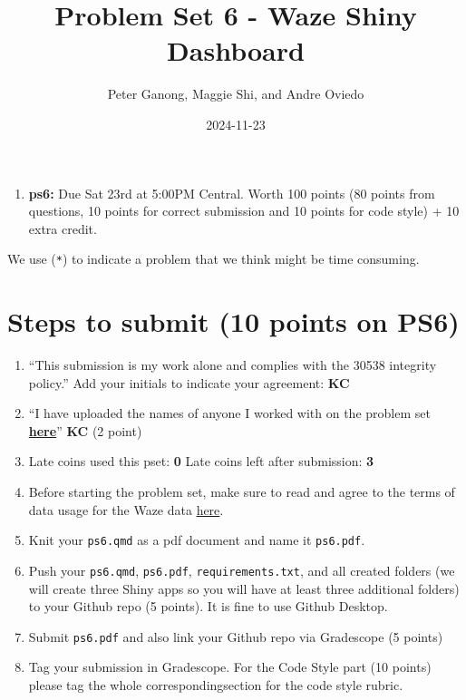 \documentclass[
  letterpaper,
  DIV=11,
  numbers=noendperiod]{scrartcl}
\title{Problem Set 6 - Waze Shiny Dashboard}
\author{Peter Ganong, Maggie Shi, and Andre Oviedo}
\date{2024-11-23}
\providecommand{\tightlist}{%
  \setlength{\itemsep}{0pt}\setlength{\parskip}{0pt}}\usepackage{longtable,booktabs,array}
\begin{document}
\maketitle



\begin{enumerate}
\def\labelenumi{\arabic{enumi}.}
\tightlist
\item
  \textbf{ps6:} Due Sat 23rd at 5:00PM Central. Worth 100 points (80
  points from questions, 10 points for correct submission and 10 points
  for code style) + 10 extra credit.
\end{enumerate}

We use (\texttt{*}) to indicate a problem that we think might be time
consuming.

\section*{Steps to submit (10 points on
PS6)}\label{steps-to-submit-10-points-on-ps6}

\begin{enumerate}
\def\labelenumi{\arabic{enumi}.}
\item
  ``This submission is my work alone and complies with the 30538
  integrity policy.'' Add your initials to indicate your agreement:
  \textbf{KC}
\item
  ``I have uploaded the names of anyone I worked with on the problem set
  \textbf{\href{https://docs.google.com/forms/d/185usrCREQaUbvAXpWhChkjghdGgmAZXA3lPWpXLLsts/edit}{here}}''
  \textbf{KC} (2 point)
\item
  Late coins used this pset: \textbf{0} Late coins left after
  submission: \textbf{3}
\item
  Before starting the problem set, make sure to read and agree to the
  terms of data usage for the Waze data
  \href{https://canvas.uchicago.edu/courses/59054/quizzes/130617}{here}.
\item
  Knit your \texttt{ps6.qmd} as a pdf document and name it
  \texttt{ps6.pdf}.
\item
  Push your \texttt{ps6.qmd}, \texttt{ps6.pdf},
  \texttt{requirements.txt}, and all created folders (we will create
  three Shiny apps so you will have at least three additional folders)
  to your Github repo (5 points). It is fine to use Github Desktop.
\item
  Submit \texttt{ps6.pdf} and also link your Github repo via Gradescope
  (5 points)
\item
  Tag your submission in Gradescope. For the Code Style part (10 points)
  please tag the whole correspondingsection for the code style rubric.
\end{enumerate}
\end{document}
